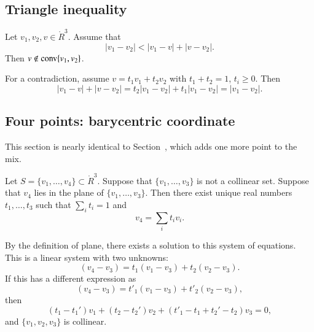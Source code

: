 \begin{tarskidata}
\begin{tarski}
\section{Triangle inequality}

\begin{lemma} 
Let $v_1,v_2,v\in\ring{R}^3$.  
Assume that
	$$|v_1-v_2| < |v_1-v| + |v - v_2|.$$
Then $v\not\in{\operatorname{conv}}\{v_1,v_2\}$.
\end{lemma}

\begin{proved}
For a contradiction, assume $v= t_1 v_1 + t_2 v_2$ with $t_1+t_2=1$, $t_i\ge0$.
Then 
$$
|v_1-v| + |v-v_2| = t_2 |v_1-v_2| + t_1 |v_1-v_2| = |v_1-v_2|.
$$
\swallowed\end{proved}
\end{tarski}







\begin{tarski}
\section{Four points: barycentric coordinate}
This section is nearly identical to Section~, which adds one more point
to the mix.


\begin{lemma}
Let $S=\{v_1,\ldots,v_4\}\subset\ring{R}^3$.  
Suppose
that $\{v_1,\ldots,v_3\}$ is not a collinear
set.   Suppose that $v_4$ lies in the plane of
$\{v_1,\ldots,v_3\}$.  
Then there exist unique real numbers
$t_1,\ldots,t_3$ such that $\sum_i t_i = 1$ and
	$$v_4 = \sum_i t_i v_i.$$
\end{lemma}

\begin{proved}  By the definition of plane,
there 
exists a solution to this system of equations.
This is a linear system with
two unknowns:
	$$(v_4- v_3) = t_1 (v_1-v_3) +
		t_2 (v_2-v_3).
	$$
If this has a different expression as
   $$
   (v_4- v_3) = t'_1 (v_1-v_3) +
		t'_2 (v_2-v_3),
   $$
then 
  $$
  (t_1-t_1') v_1 + (t_2-t_2') v_2 + (t'_1-t_1+t_2'-t_2) v_3 = 0,
  $$
and $\{v_1,v_2,v_3\}$ is collinear.
\swallowed\end{proved}
\end{tarski}




\end{tarskidata}
